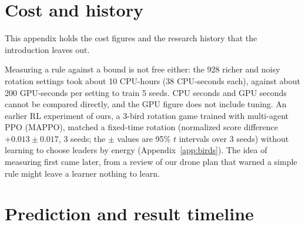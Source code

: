 \documentclass[11pt]{article}
\begin{document}
\section{Cost and history}
\label{app:history}

This appendix holds the cost figures and the research history that the introduction leaves out.

Measuring a rule against a bound is not free either: the 928 richer and noisy rotation settings took about 10 CPU-hours (38 CPU-seconds each), against about 200 GPU-seconds per setting to train 5 seeds.
CPU seconds and GPU seconds cannot be compared directly, and the GPU figure does not include tuning.
An earlier RL experiment of ours, a 3-bird rotation game trained with multi-agent PPO (MAPPO), matched a fixed-time rotation (normalized score difference $+0.013 \pm 0.017$, 3 seeds; the $\pm$ values are 95\% $t$ intervals over 3 seeds) without learning to choose leaders by energy (Appendix~\ref{app:birds}).
The idea of measuring first came later, from a review of our drone plan that warned a simple rule might leave a learner nothing to learn.

\section{Prediction and result timeline}
\label{app:timeline}
\end{document}

